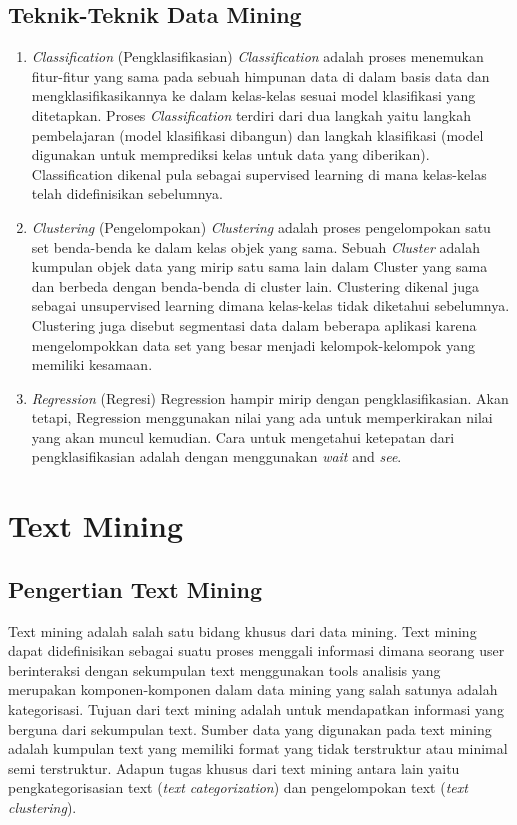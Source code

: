 \subsection{Teknik-Teknik Data Mining}
\begin{enumerate}
	\item \textit{Classification} (Pengklasifikasian)
	\textit{Classification} adalah proses menemukan fitur-fitur yang sama pada sebuah himpunan data di dalam basis data dan mengklasifikasikannya ke dalam kelas-kelas sesuai model klasifikasi yang ditetapkan. Proses \textit{Classification} terdiri dari dua langkah yaitu langkah pembelajaran (model klasifikasi dibangun) dan langkah klasifikasi (model digunakan untuk memprediksi kelas untuk data yang diberikan). Classification dikenal pula sebagai supervised learning di mana kelas-kelas telah didefinisikan sebelumnya.
	\item \textit{Clustering} (Pengelompokan)
	\textit{Clustering} adalah proses pengelompokan satu set benda-benda ke dalam kelas objek yang sama. Sebuah \textit{Cluster} adalah kumpulan objek data yang mirip satu sama lain dalam Cluster yang sama dan berbeda dengan benda-benda di cluster lain. Clustering dikenal juga sebagai unsupervised learning dimana kelas-kelas tidak diketahui sebelumnya. Clustering juga disebut segmentasi data dalam beberapa aplikasi karena mengelompokkan data set yang besar menjadi kelompok-kelompok yang memiliki kesamaan. 
	\item \textit{Regression} (Regresi)
	Regression hampir mirip dengan pengklasifikasian. Akan tetapi, Regression menggunakan nilai yang ada untuk memperkirakan nilai yang akan muncul kemudian. Cara untuk mengetahui ketepatan dari pengklasifikasian adalah dengan menggunakan \textit{wait} and \textit{see}.
\end{enumerate}

\section{Text Mining}
\label{sec:text_mining}

\subsection{Pengertian Text Mining}
Text mining adalah salah satu bidang khusus dari data mining. Text mining dapat didefinisikan sebagai suatu proses menggali informasi dimana seorang user berinteraksi dengan sekumpulan text menggunakan tools analisis yang merupakan komponen-komponen dalam data mining yang salah satunya adalah kategorisasi. \cite{feldman2006j} Tujuan dari text mining adalah untuk mendapatkan informasi yang berguna dari sekumpulan text. Sumber data yang digunakan pada text mining adalah kumpulan text yang memiliki format yang tidak terstruktur atau minimal semi terstruktur. Adapun tugas khusus dari text mining antara lain yaitu pengkategorisasian text (\textit{text categorization}) dan pengelompokan text (\textit{text clustering}).

